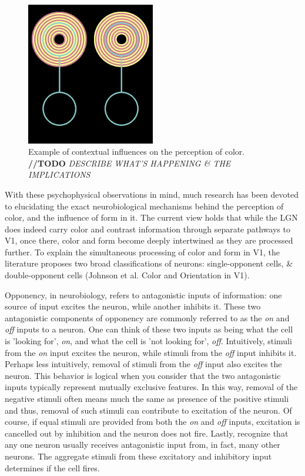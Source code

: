 \documentclass[journal,onecolumn]{IEEEtran}
\begin{document}
\begin{figure}[h]
    \center
    \includegraphics[width=0.5\textwidth]{test-circle-a-reference}
    \caption{Example of contextual influences on the perception of color. \textbf{//TODO} \textit{DESCRIBE WHAT'S HAPPENING \& THE IMPLICATIONS}}
    \label{fig:example}
\end{figure}

With these psychophysical observations in mind, much research has been devoted to elucidating the exact neurobiological mechanisms behind the perception of color, and the influence of form in it. The current view holds that while the LGN does indeed carry color and contrast information through separate pathways to V1, once there, color and form become deeply intertwined as they are processed further. To explain the simultaneous processing of color and form in V1, the literature proposes two broad classifications of neurons: single-opponent cells, \& double-opponent cells (Johnson et al. Color and Orientation in V1).

Opponency, in neurobiology, refers to antagonistic inputs of information: one source of input excites the neuron, while another inhibits it. These two antagonistic components of opponency are commonly referred to as the \textit{on} and \textit{off} inputs to a neuron. One can think of these two inputs as being what the cell is 'looking for', \textit{on}, and what the cell is 'not looking for', \textit{off}. Intuitively, stimuli from the \textit{on} input excites the neuron, while stimuli from the \textit{off} input inhibits it. Perhaps less intuitively, removal of stimuli from the \textit{off} input also excites the neuron. This behavior is logical when you consider that the two antagonistic inputs typically represent mutually exclusive features. In this way, removal of the negative stimuli often means much the same as presence of the positive stimuli and thus, removal of such stimuli can contribute to excitation of the neuron. Of course, if equal stimuli are provided from both the \textit{on} and \textit{off} inputs, excitation is cancelled out by inhibition and the neuron does not fire. Lastly, recognize that any one neuron usually receives antagonistic input from, in fact, many other neurons. The aggregate stimuli from these excitatory and inhibitory input determines if the cell fires.
\end{document}
